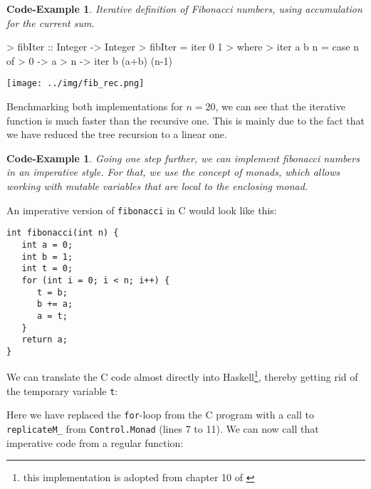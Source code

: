 \documentclass{scrartcl}
\newtheorem{impl}[defn]{Code-Example}
\numberwithin{equation}{section}
\begin{document}
\begin{impl}
Iterative definition of Fibonacci numbers, using accumulation for the current sum.
\end{impl}

\begin{haskellcode}

> fibIter :: Integer -> Integer
> fibIter = iter 0 1
>   where
>     iter a b n = case n of
>       0 -> a
>       n -> iter b (a+b) (n-1)

\end{haskellcode}

\texttt{[image: ../img/fib\_rec.png]}

Benchmarking both implementations for $n=20$, we can see that the iterative function is much faster than the recursive one. This is mainly due to the fact that we have reduced the tree recursion to a linear one.

\begin{impl}
Going one step further, we can implement fibonacci numbers in an imperative style. For that, we use the concept of monads, which allows working with mutable variables that are local to the enclosing monad.
\end{impl}

An imperative version of \texttt{fibonacci} in C would look like this:
\begin{verbatim}
int fibonacci(int n) {
   int a = 0;
   int b = 1;
   int t = 0;
   for (int i = 0; i < n; i++) {
      t = b;
      b += a;
      a = t;
   }
   return a;
}
\end{verbatim}

We can translate the C code almost directly into Haskell\footnote{this implementation is adopted from chapter 10 of \parencite{tfwh15}}, thereby getting rid of the temporary variable \texttt{t}:


Here we have replaced the {\texttt{for}}-loop from the C program with a call to {\texttt{replicateM_}} from {\texttt{Control.Monad}} (lines 7 to 11).
We can now call that imperative code from a regular function:
\end{document}
